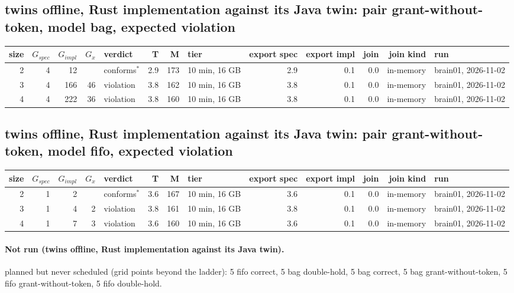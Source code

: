 \documentclass[10pt]{article}
\begin{document}
\subsection*{twins offline, Rust implementation against its Java twin: pair \textsf{grant-without-token}, model bag, expected violation}
\begin{longtable}{@{}rrrrlrrlrrrrl@{}}
\toprule
size & $G_{\mathit{spec}}$ & $G_{\mathit{impl}}$ & $G_x$ & verdict & T & M & tier & export spec & export impl & join & join kind & run \\
\midrule
\endhead
\color{red} 2 & 4 & 12 &  & conforms$^{\ast}$ & 2.9 & 173 & 10 min, 16 GB & 2.9 & 0.1 & 0.0 & in-memory & brain01, 2026-11-02 \\
\color{red} 3 & 4 & 166 & 46 & violation & 3.8 & 162 & 10 min, 16 GB & 3.8 & 0.1 & 0.0 & in-memory & brain01, 2026-11-02 \\
\color{red} 4 & 4 & 222 & 36 & violation & 3.8 & 160 & 10 min, 16 GB & 3.8 & 0.1 & 0.0 & in-memory & brain01, 2026-11-02 \\
\bottomrule
\end{longtable}
\subsection*{twins offline, Rust implementation against its Java twin: pair \textsf{grant-without-token}, model fifo, expected violation}
\begin{longtable}{@{}rrrrlrrlrrrrl@{}}
\toprule
size & $G_{\mathit{spec}}$ & $G_{\mathit{impl}}$ & $G_x$ & verdict & T & M & tier & export spec & export impl & join & join kind & run \\
\midrule
\endhead
\color{red} 2 & 1 & 2 &  & conforms$^{\ast}$ & 3.6 & 167 & 10 min, 16 GB & 3.6 & 0.1 & 0.0 & in-memory & brain01, 2026-11-02 \\
\color{red} 3 & 1 & 4 & 2 & violation & 3.8 & 161 & 10 min, 16 GB & 3.8 & 0.1 & 0.0 & in-memory & brain01, 2026-11-02 \\
\color{red} 4 & 1 & 7 & 3 & violation & 3.6 & 160 & 10 min, 16 GB & 3.6 & 0.1 & 0.0 & in-memory & brain01, 2026-11-02 \\
\bottomrule
\end{longtable}
\paragraph{Not run (twins offline, Rust implementation against its Java twin).}
planned but never scheduled (grid points beyond the ladder): 5 fifo correct, 5 bag double-hold, 5 bag correct, 5 bag grant-without-token, 5 fifo grant-without-token, 5 fifo double-hold.\par
\end{document}
